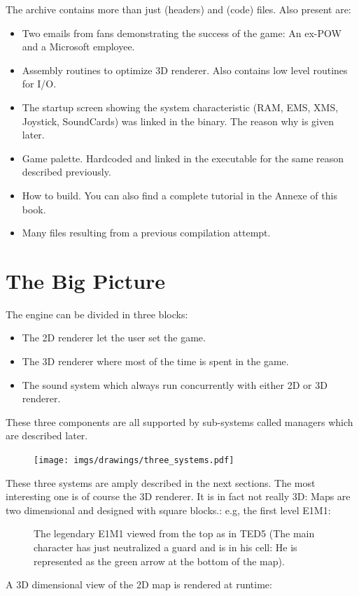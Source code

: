 \documentclass[book.tex]{subfiles}
\begin{document}
The archive contains more than just  (headers) and  (code) files. Also present are:
\begin{itemize}
\item {} Two emails from fans demonstrating the success of the game: An ex-POW and a Microsoft employee.
\item {} Assembly routines to optimize 3D renderer. Also contains low level routines for I/O.
\item {} The startup screen showing the system characteristic (RAM, EMS, XMS, Joystick, SoundCards) was linked in the binary. The reason why is given later.
\item {} Game palette. Hardcoded and linked in the executable for the same reason described previously.
\item {} How to build. You can also find a complete tutorial in the Annexe of this book.
\item Many files resulting from a previous compilation attempt.
\end{itemize}







\section{The Big Picture}
The engine can be divided in three blocks:
\begin{itemize}
\item The 2D renderer let the user set the game.
\item The 3D renderer where most of the time is spent in the game.
\item The sound system which always run concurrently with either 2D or 3D renderer. 
\end{itemize}
These three components are all supported by sub-systems called managers which are described later.
\par
\begin{figure}[H]
\centering
 \texttt{[image: imgs/drawings/three\_systems.pdf]}
 \end{figure}
 \par

 
These three systems are amply described in the next sections. The most interesting one is of course the 3D renderer. It is in fact not really 3D: Maps are two dimensional and designed with square blocks.: e.g, the first level E1M1:\par
\begin{figure}[H]
  \centering
 \caption{The legendary E1M1 viewed from the top as in TED5 (The main character has just neutralized a guard and is in his cell: He is represented as the green arrow at the bottom of the map).}
\end{figure}
\par 
A 3D dimensional view of the 2D map is rendered at runtime:
\end{document}
